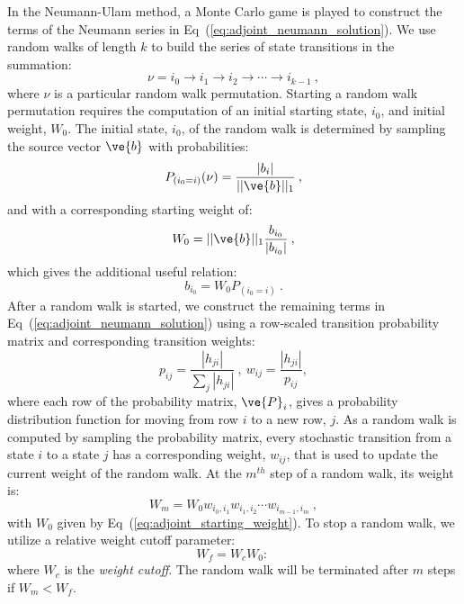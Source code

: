 \documentclass[preprint,11pt]{elsarticle}
\begin{document}
In the Neumann-Ulam method, a Monte Carlo game is played to construct the
terms of the Neumann series in Eq~(\ref{eq:adjoint_neumann_solution}). We use
random walks of length $k$ to build the series of state transitions in the
summation:
\begin{equation}
  \nu = i_0 \rightarrow i_1 \rightarrow i_2 \rightarrow \cdots \rightarrow
  i_{k-1}\:,
  \label{eq:permutation}
\end{equation}
where $\nu$ is a particular random walk permutation. Starting a random walk
permutation requires the computation of an initial starting state, $i_0$, and
initial weight, $W_0$. The initial state, $i_0$, of the random walk is
determined by sampling the source vector $\ve{b}$ with probabilities:
\begin{equation}
  P_{(i_0=i)}(\nu) = \frac{|b_i|}{||\ve{b}||_1}\:,
  \label{eq:adjoint_source_probability}
\end{equation}
and with a corresponding starting weight of:
\begin{equation}
  W_0 = ||\ve{b}||_1 \frac{b_{i_0}}{|b_{i_0}|}\:,
  \label{eq:adjoint_starting_weight}
\end{equation}
which gives the additional useful relation:
\begin{equation}
  b_{i_0} = W_0 P_{(i_0=i)}\:.
  \label{eq:adjoint_source_definition}
\end{equation}
After a random walk is started, we construct the remaining terms in
Eq~(\ref{eq:adjoint_neumann_solution}) using a row-scaled transition probability
matrix and corresponding transition weights:
\begin{equation}
  p_{ij} = \frac{|h_{ji}|}{\sum_j |h_{ji}|}\:,\ w_{ij} =
  \frac{|h_{ji}|}{p_{ij}},
  \label{eq:adjoint_probability}
\end{equation}
where each row of the probability matrix, $\ve{P}_i$, gives a probability
distribution function for moving from row $i$ to a new row, $j$. As a random
walk is computed by sampling the probability matrix, every stochastic
transition from a state $i$ to a state $j$ has a corresponding weight,
$w_{ij}$, that is used to update the current weight of the random walk. At the
$m^{th}$ step of a random walk, its weight is:
\begin{equation}
  W_{m} = W_0 w_{i_0,i_1} w_{i_1,i_2} \cdots w_{i_{m-1},i_m}\:,
  \label{eq:direct_permutation_weight}
\end{equation}
with $W_0$ given by Eq~(\ref{eq:adjoint_starting_weight}). To stop a random
walk, we utilize a relative weight cutoff parameter:
\begin{equation}
  W_f = W_c W_0:\,
  \label{eq:relative_weight_cutoff}
\end{equation}
where $W_c$ is the \textit{weight cutoff}. The random walk will be terminated
after $m$ steps if $W_m < W_f$.
\end{document}
